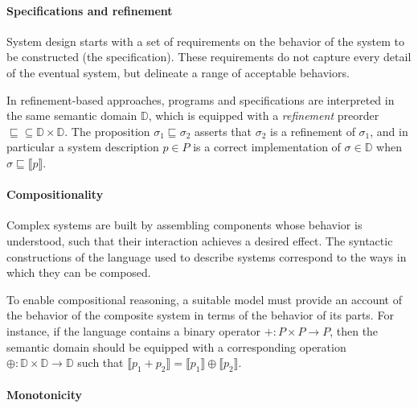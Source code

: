 \documentclass[sigplan,10pt,review,anonymous]{acmart}\settopmatter{printfolios=true,printccs=false,printacmref=false}
\begin{document}

\paragraph{Specifications and refinement} %

System design starts with a set of requirements
on the behavior of the system to be constructed
(the specification).
These requirements do not capture every detail
of the eventual system,
but delineate a range of acceptable behaviors.

In refinement-based approaches,
programs and specifications are interpreted in the same
semantic domain $\mathbb{D}$,
which is equipped with a \emph{refinement} preorder
${\sqsubseteq} \subseteq \mathbb{D} \times \mathbb{D}$.
The proposition $\sigma_1 \sqsubseteq \sigma_2$
asserts that $\sigma_2$ is a refinement of $\sigma_1$,
and in particular a system description $p \in P$ is a correct implementation
of $\sigma \in \mathbb{D}$ when
$\sigma \sqsubseteq \llbracket p \rrbracket$.


\paragraph{Compositionality} %

Complex systems are built by assembling components
whose behavior is understood,
such that their interaction achieves a desired effect.
The syntactic constructions of
the language used to describe systems
correspond to the ways in which they can be composed.

To enable compositional reasoning,
a suitable model must provide an account of
the behavior of the composite system
in terms of the behavior of its parts.
For instance,
if the language contains a binary operator
${+} : P \times P \rightarrow P$,
then the semantic domain should be equipped with
a corresponding operation
${\oplus} : \mathbb{D} \times \mathbb{D} \rightarrow \mathbb{D}$
such that
$\llbracket p_1 + p_2 \rrbracket =
 \llbracket p_1 \rrbracket \oplus \llbracket p_2 \rrbracket$.


\paragraph{Monotonicity} %
\end{document}
